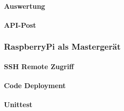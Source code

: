 \paragraph{Auswertung}
\paragraph{API-Post}

\subsubsection{RaspberryPi als Mastergerät}
\paragraph{SSH Remote Zugriff}
\paragraph{Code Deployment}
\paragraph{Unittest}

\pagebreak


